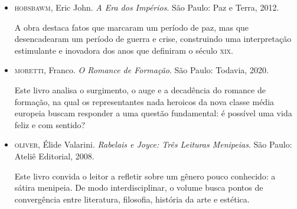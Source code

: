 \documentclass[12pt]{extarticle}
\begin{document}
\begin{itemize}
\item\textsc{hobsbawm}, Eric John. \textit{A Era dos Impérios}. São Paulo: Paz e
Terra, 2012.

A obra destaca fatos que marcaram um período de paz, mas que
desencadearam um período de guerra e crise, construindo uma
interpretação estimulante e inovadora dos anos que definiram o século
\textsc{xix}.

\item\textsc{moretti}, Franco. \textit{O Romance de Formação}. São Paulo: Todavia,
2020.

Este livro analisa o surgimento, o auge e a decadência do romance de
formação, na qual os representantes nada heroicos da nova classe média
europeia buscam responder a uma questão fundamental: é possível uma vida
feliz e com sentido?

\item\textsc{oliver}, Élide Valarini. \textit{Rabelais e Joyce: Três Leituras
Menipeias}. São Paulo: Ateliê Editorial, 2008.

Este livro convida o leitor a refletir sobre um gênero pouco conhecido:
a sátira menipeia. De modo interdisciplinar, o volume busca pontos de
convergência entre literatura, filosofia, história da arte e estética.
\end{itemize}
\end{document}
